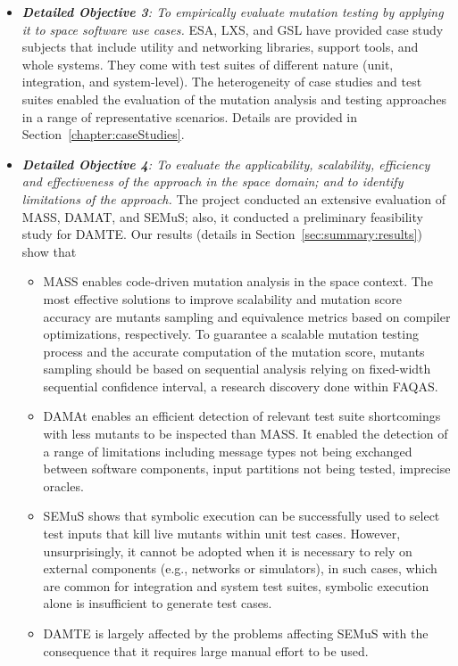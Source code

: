 \begin{itemize}
\item {\emph{\textbf{Detailed Objective 3}: To empirically evaluate mutation testing by applying it to space software use cases.}} ESA, LXS, and GSL have provided case study subjects that include utility and networking libraries, support tools, and whole systems. They come with test suites of different nature (unit, integration, and system-level). The heterogeneity of case studies and test suites enabled the evaluation of the mutation analysis and testing approaches in a range of representative scenarios. Details are provided in Section~\ref{chapter:caseStudies}.

\item {\emph{\textbf{Detailed Objective 4}: To evaluate the applicability, scalability, efficiency and effectiveness of the approach in the space domain; and to identify limitations of the approach.}} The project conducted an extensive evaluation of MASS, DAMAT, and SEMuS; also, it conducted a preliminary feasibility study for DAMTE. Our results (details in Section~\ref{sec:summary:results}) show that
\begin{itemize}
\item	MASS enables code-driven mutation analysis in the space context. The most effective solutions to improve scalability and mutation score accuracy are mutants sampling and equivalence metrics based on compiler optimizations, respectively. To guarantee a scalable mutation testing process and the accurate computation of the mutation score, mutants sampling should be based on sequential analysis relying on fixed-width sequential confidence interval, a research discovery done within FAQAS.
\item	DAMAt enables an efficient detection of relevant test suite shortcomings with less mutants to be inspected than MASS. It enabled the detection of a range of limitations including message types not being exchanged between software components,  input partitions not being tested, imprecise oracles.
\item SEMuS shows that symbolic execution can be successfully used to select test inputs that kill live mutants within unit test cases. However, unsurprisingly, it cannot be adopted when it is necessary to rely on external components (e.g., networks or simulators), in such cases, which are common for integration and system test suites, symbolic execution alone is insufficient to generate test cases.
\item DAMTE is largely affected by the problems affecting SEMuS with the consequence that it requires large manual effort to be used.
\end{itemize}


\end{itemize}
